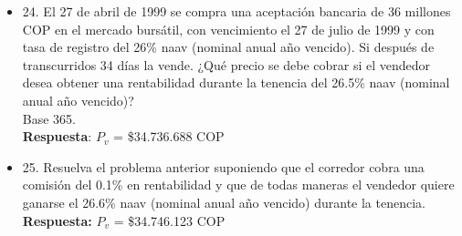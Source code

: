 \begin{itemize}
 \item 24. El 27 de abril de 1999 se compra una aceptación bancaria de 36 millones COP en el mercado bursátil, con vencimiento el 27 de julio de 1999 y con tasa de registro del 26\% naav (nominal anual año vencido). Si después de transcurridos 34 días la vende. ¿Qué precio se debe cobrar si el vendedor desea obtener una rentabilidad durante la tenencia del 26.5\% naav (nominal anual año vencido)?\\
       Base 365.\\
       \textbf{Respuesta}: $P_{v}$ = \$34.736.688 COP\\
       \medskip

 \item 25. Resuelva el problema anterior suponiendo que el corredor cobra una comisión del 0.1\% en rentabilidad y que de todas maneras el vendedor quiere ganarse el 26.6\% naav (nominal anual año vencido) durante la tenencia.\\
       \textbf{Respuesta:} $P_{v}$ = \$34.746.123 COP\\


\end{itemize}